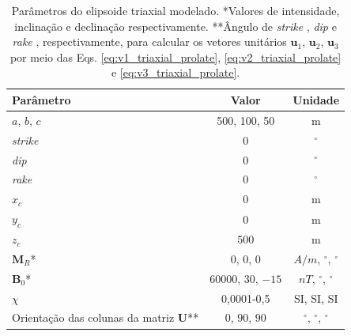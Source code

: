\begin{table}[h!]
	\begin{center}
		\begin{tabular}{|l|c|c|}
			\hline
			\textbf{Parâmetro}  & \textbf{Valor} & \textbf{Unidade} \\
			\hline 
			$a$, $b$, $c$   & 500, 100, 50 & m\\
			\hline
			\textit{strike}   & $0$ & $^{\circ}$\\
			\hline
			\textit{dip}   & $0$ & $^{\circ}$\\
			\hline
			\textit{rake}   & $0$  & $^{\circ}$\\
			\hline
			$x_c$   & 0  & m\\
			\hline          
			$y_c$   & 0  & m\\
			\hline                
			$z_c$   & 500 & m \\
			\hline
			$\mathbf{M}_{R}$*  & 0, $0$, $0$ & $A/m$, $^{\circ}$, $^{\circ}$ \\
			\hline
			$\mathbf{B}_{0}$*    & 60000, $30$, $-15$ & $nT$, $^{\circ}$, $^{\circ}$ \\
			\hline
			$\chi$   & 0,0001-0,5 & SI, SI, SI \\
			\hline
			Orientação das colunas da matriz $\mathbf{U}$**  & $0$, $90$, $90$ & $^{\circ}$, $^{\circ}$, $^{\circ}$ \\
			\hline
		\end{tabular}
		\caption{Parâmetros do elipsoide triaxial modelado. *Valores de intensidade, inclinação e declinação respectivamente. **Ângulo de \textit{strike} , \textit{dip}  e \textit{rake} , respectivamente, para calcular os vetores unitários $\mathbf{u}_{1}$, $\mathbf{u}_{2}$, $\mathbf{u}_{3}$ por meio das Eqs. \ref{eq:v1_triaxial_prolate}, \ref{eq:v2_triaxial_prolate} e \ref{eq:v3_triaxial_prolate}.}
	\end{center}
	\label{tab:triaxial_k_iso}
\end{table}

